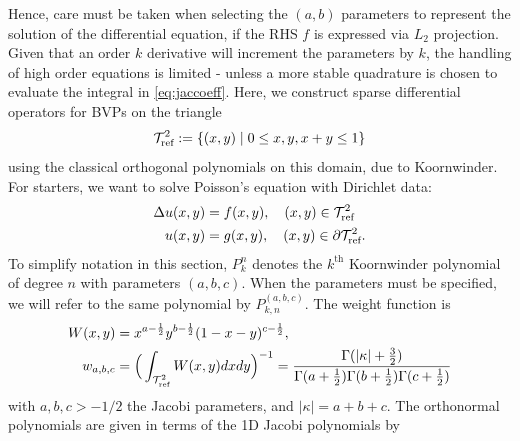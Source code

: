 Hence, care must be taken when selecting the $(a,b)$ parameters to represent the solution of the differential equation, if the RHS $f$ is expressed via $L_2$ projection. Given that an order $k$ derivative will increment the parameters by $k$, the handling of high order equations is limited - unless a more stable quadrature is chosen to evaluate the integral in \eqref{eq:jaccoeff}.
%
\newpage
{}
Here, we construct sparse differential operators for BVPs on the triangle $$\mathcal{T}_{\text{ref}}^2 := \{(x,y)\;|\; 0\leq x,y,x+y\leq 1\}$$ using the classical orthogonal polynomials on this domain, due to Koornwinder. For starters, we want to solve Poisson's equation with Dirichlet data:
\begin{equation}\label{eq:laptri}
	\begin{split}
	\Delta u(x,y) &= f(x,y),\quad (x,y) \in \mathcal{T}_{\text{ref}}^2\\
	u(x,y) &= g(x,y),\quad (x,y) \in \partial\mathcal{T}_{\text{ref}}^2.
	\end{split}
\end{equation}
To simplify notation in this section, $P_k^n$ denotes the $k^{\text{th}}$ Koornwinder polynomial of degree $n$ with parameters $(a,b,c)$. When the parameters must be specified, we will refer to the same polynomial by $P_{k,n}^{(a,b,c)}$. The weight function is
\begin{equation}\label{eq:koornweight}
	\begin{split}
	W(x,y) &= x^{a-\frac{1}{2}}y^{b-\frac{1}{2}}(1-x-y)^{c-\frac{1}{2}},\\
	w_{a,b,c} &= \Big(\int_{\mathcal{T}_{\text{ref}}^2}W(x,y)dxdy\Big)^{-1}=\frac{\Gamma(|\kappa| + \frac{3}{2})}{\Gamma(a+\frac{1}{2})\Gamma(b+\frac{1}{2})\Gamma(c+\frac{1}{2})}
	\end{split}
\end{equation}
with $a,b,c > -1/2$ the Jacobi parameters, and $|\kappa| = a+b+c$. The orthonormal polynomials are given in terms of the 1D Jacobi polynomials by
